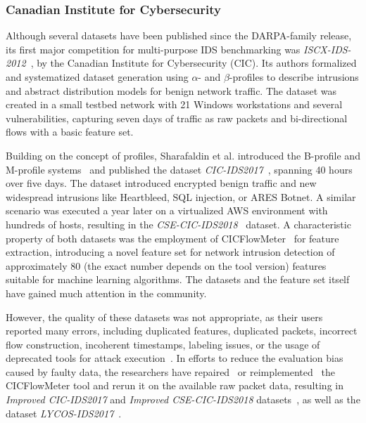 \subsubsection{Canadian Institute for Cybersecurity}
\label{sssec:ndatasurv_general_cic}

Although several datasets have been published since the DARPA-family release, its first major competition for multi-purpose IDS benchmarking was \emph{ISCX-IDS-2012}~\cite{shiravi2012_iscx2012}, by the Canadian Institute for Cybersecurity (CIC). Its authors formalized and systematized dataset generation using $\alpha$- and $\beta$-profiles to describe intrusions and abstract distribution models for benign network traffic. The dataset was created in a small testbed network with 21 Windows workstations and several vulnerabilities, capturing seven days of traffic as raw packets and bi-directional flows with a basic feature set.

Building on the concept of profiles, Sharafaldin et al. introduced the B-profile and M-profile systems~\cite{sharafaldin2018_towards_reliable_ids_dataset} and published the dataset \emph{CIC-IDS2017}~\cite{sharafin2018_cicids2017_csecic2018}, spanning 40 hours over five days. The dataset introduced encrypted benign traffic and new widespread intrusions like Heartbleed, SQL injection, or ARES Botnet. A similar scenario was executed a year later on a virtualized AWS environment with hundreds of hosts, resulting in the \emph{CSE-CIC-IDS2018}~\cite{sharafin2018_cicids2017_csecic2018} dataset. A characteristic property of both datasets was the employment of CICFlowMeter~\cite{lashkari2016_cicflowmeter} for feature extraction, introducing a novel feature set for network intrusion detection of approximately 80 (the exact number depends on the tool version) features suitable for machine learning algorithms. The datasets and the feature set itself have gained much attention in the community.

However, the quality of these datasets was not appropriate, as their users reported many errors, including duplicated features, duplicated packets, incorrect flow construction, incoherent timestamps, labeling issues, or the usage of deprecated tools for attack execution~\cite{engelen2021_cicids2017_troubleshooting, liu2022_error_prevalence_nids_data, rosay2022_lycos_ids2017, lanvin2023_errors_cicids2017}. In efforts to reduce the evaluation bias caused by faulty data, the researchers have repaired~\cite{liu2022_error_prevalence_nids_data} or reimplemented~\cite{rosay2022_lycos_ids2017} the CICFlowMeter tool and rerun it on the available raw packet data, resulting in \emph{Improved CIC-IDS2017} and \emph{Improved CSE-CIC-IDS2018} datasets~\cite{liu2022_error_prevalence_nids_data}, as well as the dataset \emph{LYCOS-IDS2017}~\cite{rosay2022_lycos_ids2017}.

